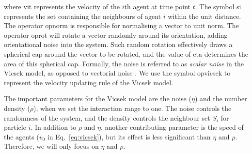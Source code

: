 \documentclass[11pt,twoside]{report}
\begin{document}

\noindent where \gls{vit} represents the velocity of the $i$th agent at time point $t$.
The symbol \gls{si} represents the set containing the neighbours of agent $i$ within the unit distance.
The operator \gls{opnorm} is responsible for normalising a vector to unit norm. The operator \gls{oprot} will rotate a vector randomly around its orientation, adding orientational noise into the system. Such random rotation effectively draws a spherical cap around the vector to be rotated, and the value of \gls{eta} determines the area of this spherical cap.
Formally, the noise is referred to as \emph{scalar noise} in the Vicsek model, as opposed to vectorial noise \cite{pimentel2008}.
We use the symbol \gls{opvicsek} to represent the velocity updating rule of the Vicsek model.


The important parameters for the Vicsek model are the noise ($\eta$) and the number density ($\rho$), when we set the interaction range to one. The noise controls the randomness of the system, and the density controls the neighbour set $S_{i}$ for particle $i$. In addition to $\rho$ and $\eta$, another contributing parameter is the speed of the agents ($v_0$ in Eq.~\ref{eq:vicsek}), but its effect is less significant than $\eta$ and $\rho$. Therefore, we will only focus on $\eta$ and $\rho$.
\end{document}
